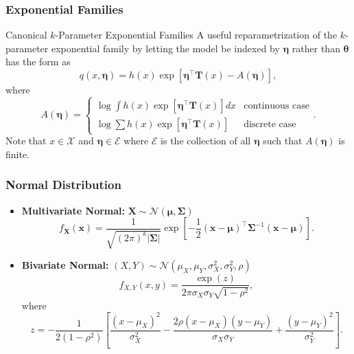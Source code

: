 \documentclass[serif,mathserif,professionalfont]{beamer}
\begin{document}
\begin{frame}
	
	\frametitle{Exponential Families}
	
	\begin{block}{Canonical $ k $-Parameter Exponential Families}
		A useful reparametrization of the $ k $-parameter exponential family by letting the model be indexed by $ \boldsymbol{\eta} $ rather than $ \boldsymbol{\theta} $ has the form as
		\begin{equation*}
		q\left(x, \boldsymbol{\eta} \right) = h\left(x \right) \exp \left[\boldsymbol{\eta}^\top \bm{T}\left(x \right) - A\left(\boldsymbol{\eta} \right) \right],
		\end{equation*}
		where
		\begin{equation*}
		A\left(\boldsymbol{\eta} \right) = 
		\begin{cases}
		\displaystyle \log \int h\left(x \right) \exp \left[\boldsymbol{\eta}^\top \bm{T}\left(x \right) \right] dx  & \text{continuous case} \\
		\displaystyle \log \sum h\left(x \right) \exp \left[\boldsymbol{\eta}^\top \bm{T}\left(x \right) \right]  & \text{discrete case}
		\end{cases}.
		\end{equation*}
		Note that $ x \in \mathcal{X} $ and $ \boldsymbol{\eta} \in \mathcal{E} $ where $ \mathcal{E} $ is the collection of all $ \boldsymbol{\eta} $ such that $ A\left(\boldsymbol{\eta} \right) $ is finite.
	\end{block}
	
\end{frame}






\begin{frame}
	
	\frametitle{Normal Distribution}
	
	\begin{itemize}
		\item \textbf{Multivariate Normal:} $ \bm{X} \sim \mathcal{N}\left(\bm{\mu}, \bm{\Sigma} \right) $
		\begin{equation*}
		f_{\bm{X}}(\bm{x}) = \frac{1}{\sqrt{(2\pi)^k |\bm{\Sigma}|}} \exp \left[ - \frac{1}{2} (\bm{x} - \bm{\mu})^\top \bm{\Sigma}^{-1} (\bm{x} - \bm{\mu}) \right].
		\end{equation*}
		\item \textbf{Bivariate Normal:} $ \left(X, Y \right) \sim \mathcal{N}\left(\mu_X, \mu_Y, \sigma_X^2, \sigma_Y^2, \rho \right) $
		\begin{equation*}
		f_{X,Y}(x, y) = \frac{\exp \left(z \right)}{2 \pi \sigma_X \sigma_Y \sqrt{1 - \rho^2} },
		\end{equation*}
		where
		\begin{equation*}
		z = - \frac{1}{2 (1-\rho^2)} \left[\frac{(x-\mu_X)^2}{\sigma_X^2} - \frac{2 \rho (x-\mu_X)(y-\mu_Y)}{\sigma_X \sigma_Y} + \frac{(y-\mu_Y)^2}{\sigma_Y^2} \right].
		\end{equation*}
	\end{itemize}

\end{frame}
\end{document}
